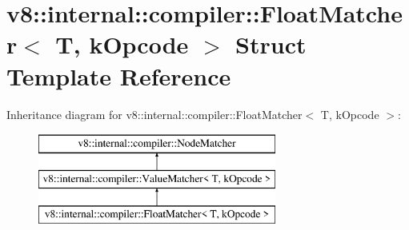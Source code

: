 \hypertarget{structv8_1_1internal_1_1compiler_1_1_float_matcher}{}\section{v8\+:\+:internal\+:\+:compiler\+:\+:Float\+Matcher$<$ T, k\+Opcode $>$ Struct Template Reference}
\label{structv8_1_1internal_1_1compiler_1_1_float_matcher}
Inheritance diagram for v8\+:\+:internal\+:\+:compiler\+:\+:Float\+Matcher$<$ T, k\+Opcode $>$\+:\begin{figure}[H]
\begin{center}
\leavevmode
\includegraphics[height=3.000000cm]{structv8_1_1internal_1_1compiler_1_1_float_matcher}
\end{center}
\end{figure}
